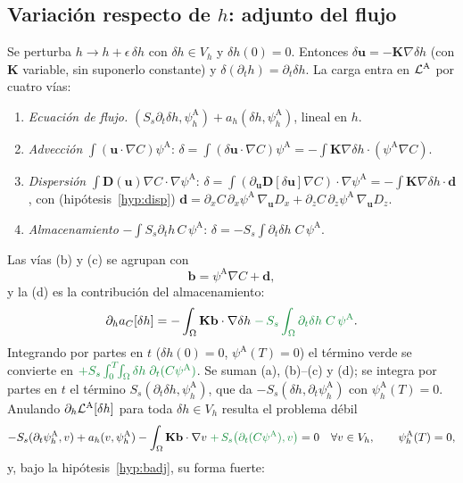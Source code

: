 \documentclass[11pt]{article}
\numberwithin{equation}{section}
\theoremstyle{plain}
\theoremstyle{definition}
\theoremstyle{remark}
\newcommand{\bu}{\mathbf{u}}
\newcommand{\bK}{\mathbf{K}}
\newcommand{\bD}{\mathbf{D}}
\newcommand{\bb}{\mathbf{b}}
\newcommand{\bd}{\mathbf{d}}
\newcommand{\pA}{\psi^{\mathrm A}}          %
\newcommand{\phA}{\psi_h^{\mathrm A}}       %
\newcommand{\alm}[1]{{\color{cAlm}#1}}
\begin{document}
\subsection{Variación respecto de $h$: adjunto del flujo}
Se perturba $h\to h+\epsilon\,\delta h$ con $\delta h\in V_h$ y $\delta h(0)=0$. Entonces $\delta\bu=-\bK\nabla\delta h$ (con $\bK$ variable, sin suponerlo constante) y
$\delta(\partial_th)=\partial_t\delta h$. La carga entra en $\mathcal{L}^{\rm A}$ por cuatro vías:
\begin{enumerate}[label=\textbf{(\alph*)},nosep]
\item \emph{Ecuación de flujo.} $(S_s\partial_t\delta h,\phA)+a_h(\delta h,\phA)$, lineal en $h$.
\item \emph{Advección} $\int(\bu\cdot\nabla C)\pA$: $\delta=\int(\delta\bu\cdot\nabla C)\pA=-\int\bK\nabla\delta h\cdot(\pA\nabla C)$.
\item \emph{Dispersión} $\int\bD(\bu)\nabla C\cdot\nabla\pA$: $\delta=\int(\partial_{\bu}\bD[\delta\bu]\nabla C)\cdot\nabla\pA
  =-\int\bK\nabla\delta h\cdot\bd$, con (hipótesis~\ref{hyp:disp})
  $\bd=\partial_xC\,\partial_x\pA\,\nabla_{\bu}D_x+\partial_zC\,\partial_z\pA\,\nabla_{\bu}D_z$.
\item \emph{Almacenamiento} $-\int S_s\partial_th\,C\,\pA$: $\delta=-S_s\int\partial_t\delta h\;C\,\pA$.
\end{enumerate}
Las vías (b) y (c) se agrupan con
\begin{equation}
\bb=\pA\nabla C+\bd ,
\label{eq:campo_b}
\end{equation}
y la (d) es la contribución del almacenamiento:
\[
\partial_ha_C[\delta h]=-\int_\Omega\bK\bb\cdot\nabla\delta h\;\alm{-\,S_s\int_\Omega\partial_t\delta h\;C\,\pA}.
\]
Integrando por partes en $t$ ($\delta h(0)=0$, $\pA(T)=0$) el término verde se convierte en
$\alm{+S_s\int_0^T\!\!\int_\Omega\delta h\;\partial_t(C\pA)}$. Se suman (a), (b)--(c) y (d); se integra por partes en $t$
el término $S_s(\partial_t\delta h,\phA)$, que da $-S_s(\delta h,\partial_t\phA)$ con $\phA(T)=0$. Anulando $\partial_h\mathcal{L}^{\rm A}[\delta h]$ para toda $\delta h\in V_h$ resulta el problema débil
\begin{equation}
-S_s(\partial_t\phA,v)+a_h(v,\phA)-\int_\Omega\bK\bb\cdot\nabla v\;\alm{+\,S_s\bigl(\partial_t(C\pA),v\bigr)}=0\quad\forall v\in V_h,\qquad\phA(T)=0 ,
\label{eq:adj_flujo_debil}
\end{equation}
y, bajo la hipótesis~\ref{hyp:badj}, su forma fuerte:
\end{document}
